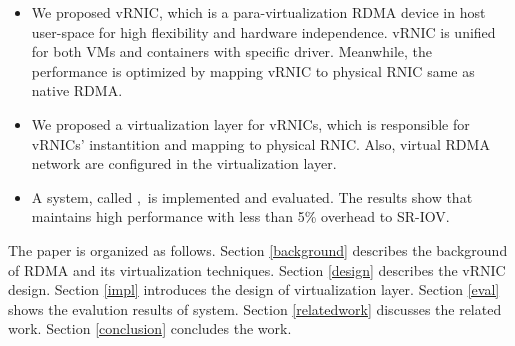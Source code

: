 \begin{itemize}
	\item We proposed vRNIC, which is a para-virtualization RDMA device in host user-space for high flexibility and hardware independence. vRNIC is unified for both VMs and containers with specific driver. Meanwhile, the performance is optimized by mapping vRNIC to physical RNIC same as native RDMA.
	
	\item We proposed a virtualization layer for vRNICs, which is responsible for vRNICs' instantition and mapping to physical RNIC. Also, virtual RDMA network are configured in the virtualization layer.
	
	\item A system, called \sys,~is implemented and evaluated. The results show that \sys maintains high performance with less than 5\% overhead to SR-IOV.
\end{itemize}

The paper is organized as follows. Section \ref{background} describes the background of RDMA and its virtualization techniques. Section \ref{design} describes the vRNIC design. Section \ref{impl} introduces the design of virtualization layer. Section \ref{eval} shows the evalution results of \sys system. Section \ref{relatedwork} discusses the related work. Section \ref{conclusion} concludes the work.